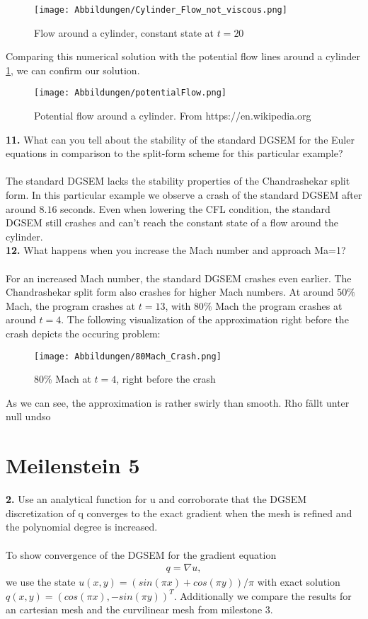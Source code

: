 \documentclass[11pt]{scrartcl}
\begin{document}
\begin{figure}[H]
\texttt{[image: Abbildungen/Cylinder\_Flow\_not\_viscous.png]}
\caption{Flow around a cylinder, constant state at $t = 20 $}
\end{figure} 
Comparing this numerical solution with the potential flow lines around a cylinder \ref{potentialFlow}, we can confirm our solution. \\
\begin{figure}[H]
\centering
\texttt{[image: Abbildungen/potentialFlow.png]}
\label{potentialFlow}
\caption{Potential flow around a cylinder. From https://en.wikipedia.org}
\end{figure}

\textbf{11.} What can you tell about the stability of the standard DGSEM for the Euler equations in comparison to the split-form scheme for this particular example?\\ \ \\
The standard DGSEM lacks the stability properties of the Chandrashekar split form. In this particular example we observe a crash of the standard DGSEM after around $8.16$ seconds. Even when lowering the CFL condition, the standard DGSEM still crashes and can't reach the constant state of a flow around the cylinder.\\
\textbf{12.} What happens when you increase the Mach number and approach Ma=1? \\ \ \\
For an increased Mach number, the standard DGSEM crashes even earlier. The Chandrashekar split form also crashes for higher Mach numbers. At around $50\%$ Mach, the program crashes at $t = 13$, with $80\%$ Mach the program crashes at around $t=4$. The following visualization of the approximation right before the crash depicts the occuring problem: \\
\begin{figure}[H]
\texttt{[image: Abbildungen/80Mach\_Crash.png]}
\caption{80\% Mach at $t=4$, right before the crash}
\end{figure}
As we can see, the approximation is rather swirly than smooth. Rho fällt unter null undso


\newpage
\section{Meilenstein 5}

\textbf{2.} Use an analytical function for u and corroborate that the DGSEM
discretization of q converges to the exact gradient when the mesh is
refined and the polynomial degree is increased.\\
\\
To show convergence of the DGSEM for the gradient equation
\begin{align*}
q = \nabla u,
\end{align*}
we use the state $u(x, y)=(sin(\pi x) + cos(\pi y))/\pi$ with exact solution $q(x, y) = (cos(\pi x), -sin(\pi y))^T$. Additionally we compare the results for an cartesian mesh and the curvilinear mesh from milestone $3$.
\end{document}
